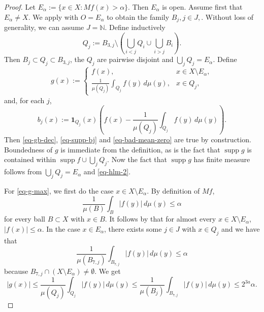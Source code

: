 \documentclass[10pt,a4paper]{article}
\theoremstyle{plain}
\theoremstyle{definition}
\numberwithin{equation}{subsection}
\newcommand{\N}{{\mathbb{N}}}
\DeclareMathOperator{\supp}{\operatorname{supp}}
\newcommand{\leanok}{}
\begin{document}
\begin{proof}
\leanok
Let $E_\alpha:=\{x\in X: Mf(x)>\alpha\}$.
Then $E_\alpha$ is open. Assume first that $E_\alpha \ne X$. We apply  with $O=E_\alpha$ to obtain the family $B_j, j\in J,$. Without loss of generality, we can assume $J=\N$. Define inductively
\begin{equation}
    Q_j := B_{3,j} \setminus \left(\bigcup_{i<j} Q_i \cup \bigcup_{i>j} B_i \right).
\end{equation}
Then $B_j\subset Q_j\subset B_{3,j}$, the $Q_j$ are pairwise disjoint and $\bigcup_j Q_j = E_\alpha$.
Define
\begin{equation}
    \label{eq-g-def}
    g(x):=\begin{cases}
     f(x), & x\in X\setminus E_\alpha,\\
     \frac{1}{\mu(Q_j)}\int_{Q_j} f(y)\, d\mu(y), &x\in Q_j,
    \end{cases}
\end{equation}
and, for each $j$,
\begin{equation}
    b_j(x):= \mathbf{1}_{Q_j}(x) \left(f(x)-\frac{1}{\mu(Q_j)}\int_{Q_j} f(y)\, d\mu(y) \right).
\end{equation}
Then \eqref{eq-gb-dec}, \eqref{eq-supp-bj} and \eqref{eq-bad-mean-zero} are true by construction.
Boundedness of $g$ is immediate from the definition, as is the fact that $\supp g$ is contained within
$\supp f \cup \bigcup_j Q_j$. Now the fact that $\supp g$ has finite measure follows from
$\bigcup_j Q_j = E_\alpha$ and \eqref{eq-hlm-2}.

For \eqref{eq-g-max}, we first do the case $x\in X\setminus E_\alpha$. By definition of $Mf$,
\begin{equation}
    \frac{1}{\mu(B)}\int_B |f(y)|\,d\mu(y) \le \alpha
\end{equation}
for every ball $B\subset X$ with $x\in B$. It follows by  that for almost every $x\in X\setminus E_\alpha$, $|f(x)|\le \alpha$.
In the case $x\in E_\alpha$, there exists some $j\in J$ with $x\in Q_j$ and we have that
\begin{equation}
    \label{large-ball-estimate}
    \frac{1}{\mu(B_{7,j})} \int_{B_{7,j}} |f(y)| \,d\mu(y) \le \alpha
\end{equation}
because $B_{7,j}\cap (X\setminus E_\alpha) \ne \emptyset$. We get
\begin{equation}
    |g(x)| \le \frac{1}{\mu(Q_j)}\int_{Q_j} |f(y)|\, d\mu(y) \le \frac{1}{\mu(B_j)}\int_{B_{7,j}} |f(y)| \, d\mu(y) \le 2^{3a}\alpha .
\end{equation}


\end{proof}
\end{document}
